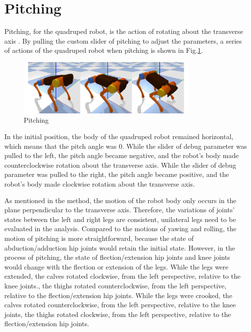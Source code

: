 \section{Pitching}

Pitching, for the quadruped robot, is the action of rotating about the transverse axis \cite{ref:6DOF}. By pulling the custom slider of pitching to adjust the parameters, a series of actions of the quadruped robot when pitching is shown in Fig.\ref{fig: pitching}.

\begin{figure}[htbp]
    \centering
    \includegraphics[width=0.8\textwidth]{figures/pitching.png}
    \caption{Pitching}
    \label{fig: pitching}
\end{figure}

In the initial position, the body of the quadruped robot remained horizontal, which means that the pitch angle was 0. While the slider of debug parameter was pulled to the left, the pitch angle became negative, and the robot's body made counterclockwise rotation about the transverse axis. While the slider of debug parameter was pulled to the right, the pitch angle became positive, and the robot's body made clockwise rotation about the transverse axis.

As mentioned in the method, the motion of the robot body only occurs in the plane perpendicular to the transverse axis. Therefore, the variations of joints' states between the left and right legs are consistent, unilateral legs need to be evaluated in the analysis. Compared to the motions of yawing and rolling, the motion of pitching is more straightforward, because the state of abduction/adduction hip joints would retain the initial state. However, in the process of pitching, the state of flection/extension hip joints and knee joints would change with the flection or extension of the legs. While the legs were extended, the calves rotated clockwise, from the left perspective, relative to the knee joints., the thighs rotated counterclockwise, from the left perspective, relative to the flection/extension hip joints. While the legs were crooked, the calves rotated counterclockwise, from the left perspective, relative to the knee joints, the thighs rotated clockwise, from the left perspective, relative to the flection/extension hip joints.


